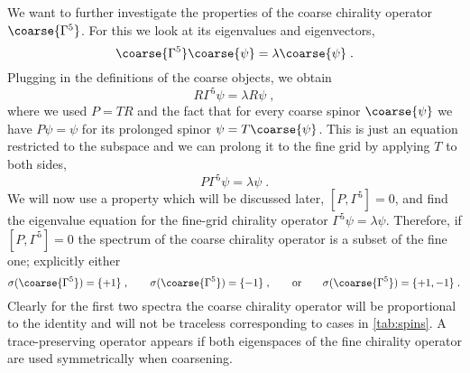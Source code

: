 We want to further investigate the properties of the coarse chirality operator $\coarse{\Gamma^{5}}$.
For this we look at its eigenvalues and eigenvectors,
\begin{equation}
\coarse{\Gamma^{5}} \coarse{\psi} = \lambda \coarse{\psi} \;.
\end{equation}
Plugging in the definitions of the coarse objects, we obtain
\begin{equation}
R \Gamma^{5} \psi = \lambda R \psi \;,
\end{equation}
where we used $P = TR$ and the fact that for every coarse spinor $\coarse{\psi}$ we have $P \psi = \psi$ for its prolonged spinor $\psi = T \coarse{\psi}$.
This is just an equation restricted to the subspace and we can prolong it to the fine grid by applying $T$ to both sides,
\begin{equation}
P \Gamma^{5} \psi = \lambda \psi \;.
\end{equation}
We will now use a property which will be discussed later, $[P, \Gamma^{5}] = 0$, and find the eigenvalue equation for the fine-grid chirality operator $\Gamma^{5} \psi = \lambda \psi$.
Therefore, if $[P, \Gamma^{5}] = 0$ the spectrum of the coarse chirality operator is a subset of the fine one; explicitly either
\begin{equation} \label{eq:sigma}
\sigma(\coarse{\Gamma^{5}}) = \{+1\} \;,
\qquad
\sigma(\coarse{\Gamma^{5}}) = \{-1\} \;,
\qquad
\text{or}
\qquad
\sigma(\coarse{\Gamma^{5}}) = \{+1, -1\} \;.
\end{equation}
Clearly for the first two spectra the coarse chirality operator will be proportional to the identity and will not be traceless corresponding to cases  in \cref{tab:spins}.
A trace-preserving operator appears if both eigenspaces of the fine chirality operator are used symmetrically when coarsening.


